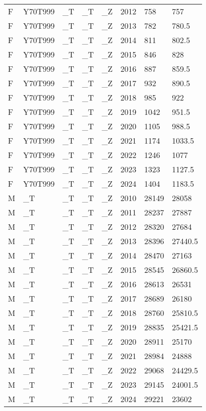 \begin{longtable}[t]{llllllll}
F & Y70T999 & \_T & \_T & \_Z & 2012 & 758 & 757\\
F & Y70T999 & \_T & \_T & \_Z & 2013 & 782 & 780.5\\
F & Y70T999 & \_T & \_T & \_Z & 2014 & 811 & 802.5\\
\addlinespace
F & Y70T999 & \_T & \_T & \_Z & 2015 & 846 & 828\\
F & Y70T999 & \_T & \_T & \_Z & 2016 & 887 & 859.5\\
F & Y70T999 & \_T & \_T & \_Z & 2017 & 932 & 890.5\\
F & Y70T999 & \_T & \_T & \_Z & 2018 & 985 & 922\\
F & Y70T999 & \_T & \_T & \_Z & 2019 & 1042 & 951.5\\
\addlinespace
F & Y70T999 & \_T & \_T & \_Z & 2020 & 1105 & 988.5\\
F & Y70T999 & \_T & \_T & \_Z & 2021 & 1174 & 1033.5\\
F & Y70T999 & \_T & \_T & \_Z & 2022 & 1246 & 1077\\
F & Y70T999 & \_T & \_T & \_Z & 2023 & 1323 & 1127.5\\
F & Y70T999 & \_T & \_T & \_Z & 2024 & 1404 & 1183.5\\
\addlinespace
M & \_T & \_T & \_T & \_Z & 2010 & 28149 & 28058\\
M & \_T & \_T & \_T & \_Z & 2011 & 28237 & 27887\\
M & \_T & \_T & \_T & \_Z & 2012 & 28320 & 27684\\
M & \_T & \_T & \_T & \_Z & 2013 & 28396 & 27440.5\\
M & \_T & \_T & \_T & \_Z & 2014 & 28470 & 27163\\
\addlinespace
M & \_T & \_T & \_T & \_Z & 2015 & 28545 & 26860.5\\
M & \_T & \_T & \_T & \_Z & 2016 & 28613 & 26531\\
M & \_T & \_T & \_T & \_Z & 2017 & 28689 & 26180\\
M & \_T & \_T & \_T & \_Z & 2018 & 28760 & 25810.5\\
M & \_T & \_T & \_T & \_Z & 2019 & 28835 & 25421.5\\
\addlinespace
M & \_T & \_T & \_T & \_Z & 2020 & 28911 & 25170\\
M & \_T & \_T & \_T & \_Z & 2021 & 28984 & 24888\\
M & \_T & \_T & \_T & \_Z & 2022 & 29068 & 24429.5\\
M & \_T & \_T & \_T & \_Z & 2023 & 29145 & 24001.5\\
M & \_T & \_T & \_T & \_Z & 2024 & 29221 & 23602\\

\end{longtable}
